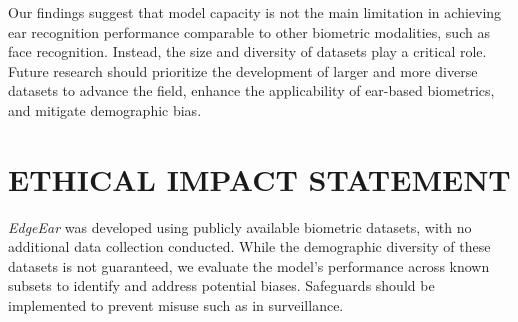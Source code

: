 \documentclass[a4paper, 10pt, conference]{ieeeconf}
\begin{document}
Our findings suggest that model capacity is not the main limitation in achieving ear recognition performance comparable to other biometric modalities, such as face recognition. Instead, the size and diversity of datasets play a critical role. Future research should prioritize the development of larger and more diverse datasets to advance the field, enhance the applicability of ear-based biometrics, and mitigate demographic bias.

\section*{ETHICAL IMPACT STATEMENT}

\textit{EdgeEar} was developed using publicly available biometric datasets, with no additional data collection conducted. While the demographic diversity of these datasets is not guaranteed, we evaluate the model’s performance across known subsets to identify and address potential biases.
Safeguards should be implemented to prevent misuse such as in surveillance.


\newpage 
{\small


}
\end{document}
